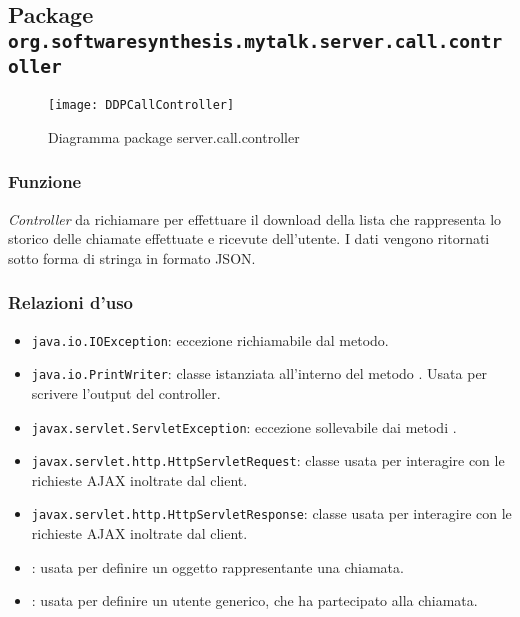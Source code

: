 \subsection{Package \texttt{org.softwaresynthesis.mytalk.server.call.controller}}\label{sec:callServlet}

\begin{center}
\begin{figure}[H]
  \texttt{[image: DDPCallController]}
\caption{Diagramma package server.call.controller}
\end{figure}
\end{center}


\subsubsection*{Funzione}
\textit{Controller} da richiamare per effettuare il download della lista che rappresenta lo storico delle chiamate effettuate e ricevute dell'utente. I dati vengono ritornati sotto forma di stringa in formato JSON.

\subsubsection*{Relazioni d'uso}
\begin{itemize}
	\item \texttt{java.io.IOException}: eccezione richiamabile dal metodo.
	\item \texttt{java.io.PrintWriter}: classe istanziata all'interno del metodo . Usata per scrivere l'output del controller.
	\item \texttt{javax.servlet.ServletException}: eccezione sollevabile dai metodi .
	\item \texttt{javax.servlet.http.HttpServletRequest}: classe usata per interagire con le richieste AJAX inoltrate dal client.
	\item \texttt{javax.servlet.http.HttpServletResponse}: classe usata per interagire con le richieste AJAX inoltrate dal client.
	\item {}: usata per definire un oggetto rappresentante una chiamata.
	\item {}: usata per definire un utente generico, che ha partecipato alla chiamata.
\end{itemize}

